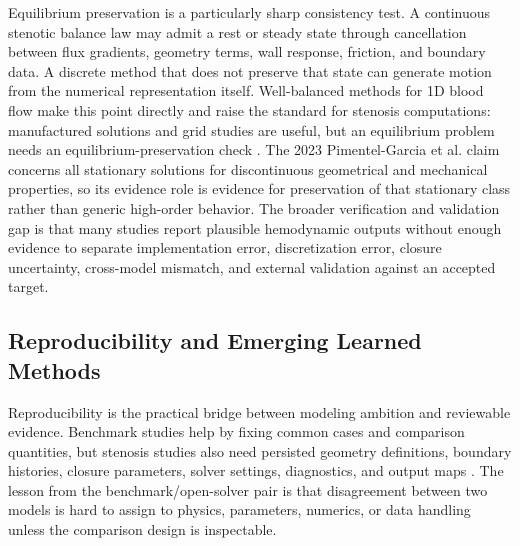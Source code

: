 Equilibrium preservation is a particularly sharp consistency test. A continuous
stenotic balance law may admit a rest or steady state through cancellation
between flux gradients, geometry terms, wall response, friction, and boundary
data. A discrete method that does not preserve that state can generate motion
from the numerical representation itself. Well-balanced methods for 1D blood
flow make this point directly and raise the standard for stenosis
computations: manufactured solutions and grid studies are useful, but an
equilibrium problem needs an equilibrium-preservation check
\cite{PimentelGarciaEtAl2023HighOrderWellBalanced}. The 2023 Pimentel-Garcia
et al. claim concerns all stationary solutions for discontinuous geometrical
and mechanical properties, so its evidence role is evidence for preservation of
that stationary class rather than generic high-order behavior. The broader verification and validation
gap is that many studies report plausible hemodynamic outputs without enough
evidence to separate implementation error, discretization error, closure
uncertainty, cross-model mismatch, and external validation against an accepted
target.

\subsection{Reproducibility and Emerging Learned Methods}
\label{subsec:synthesis-reproducibility-learned-methods}

Reproducibility is the practical bridge between modeling ambition and reviewable
evidence. Benchmark studies help by fixing common cases and comparison
quantities, but stenosis studies also need persisted geometry definitions,
boundary histories, closure parameters, solver settings, diagnostics, and output
maps \cite{BoileauEtAl2015Benchmark,BenemeritoEtAl2024OpenBF}. The lesson from
the benchmark/open-solver pair is that disagreement between two models is hard
to assign to physics, parameters, numerics, or data handling unless the
comparison design is inspectable.

